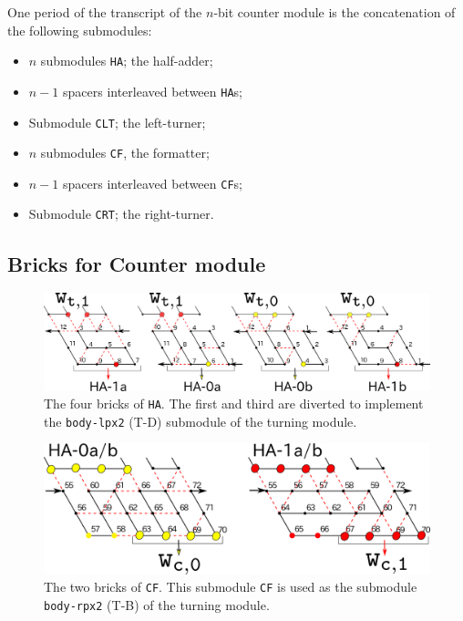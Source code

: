\documentclass[runningheads]{llncs}
\begin{document}
One period of the transcript of the $n$-bit counter module is the concatenation of the following submodules: 
\begin{itemize}
\item $n$ submodules \texttt{HA}; the half-adder; 
\item $n-1$ spacers interleaved between \texttt{HA}s; 
\item Submodule \texttt{CLT}; the left-turner; 
\item $n$ submodules \texttt{CF}, the formatter; 
\item $n-1$ spacers interleaved between \texttt{CF}s; 
\item Submodule \texttt{CRT}; the right-turner.
\end{itemize}

	\subsection{Bricks for Counter module}
	\label{ap_subsect:Counter_module_bricks}

\begin{figure}[htb]
\centering
\includegraphics[width=\linewidth]{Figs/counter_zig.png}
\caption{The four bricks of \texttt{HA}.
The first and third are diverted to implement the \texttt{body-lpx2} (T-D) submodule of the turning module. 
}
\label{fig:half-adder}
\end{figure}

\begin{figure}[htb]
\centering
\includegraphics[width=0.66\linewidth]{Figs/counter_zag.png}
\caption{The two bricks of \texttt{CF}.
This submodule \texttt{CF} is used as the submodule \texttt{body-rpx2} (T-B) of the turning module. 
}
\label{fig:half-adder}
\end{figure}
\end{document}
